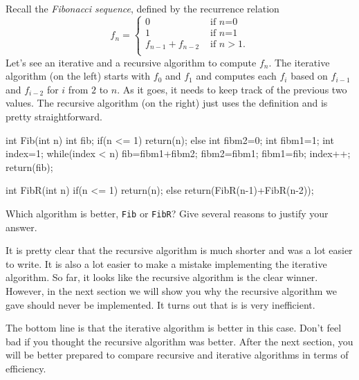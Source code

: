 \begin{exa}\label{exa:fibAlg}
Recall the {\em Fibonacci sequence}, defined by the recurrence relation
$$f_n=\left\{
\begin{array}{ll}
0&\mbox{ if $n$=0}\\
1&\mbox{ if $n$=1}\\
f_{n-1}+f_{n-2}&\mbox{ if }n>1.\\
\end{array}
\right.
$$
Let's see an iterative and a recursive algorithm to compute $f_n$.
The iterative algorithm (on the left) starts with $f_0$ and $f_1$ and computes
each $f_i$ based on $f_{i-1}$ and $f_{i-2}$ for $i$ from $2$ to $n$.
As it goes, it needs to keep track of the previous two values.
The recursive algorithm (on the right) just uses the definition and is pretty
straightforward.

\noindent
\begin{minipage}[t]{.4\textwidth}
\begin{code}
int Fib(int n) {
    int fib;
    if(n <= 1) {
       return(n);
    } else {
       int fibm2=0;
       int fibm1=1;
       int index=1;
       while(index < n) {
          fib=fibm1+fibm2;
          fibm2=fibm1;
          fibm1=fib;
          index++;
       }
       return(fib); 
    }
}
\end{code} 
\end{minipage}
\hfill 
\begin{minipage}[t]{.5\textwidth}
\begin{code}
int FibR(int n) {
    if(n <= 1) {
       return(n);
    } else { 
       return(FibR(n-1)+FibR(n-2));
    }
}
\end{code} 
\end{minipage}
\end{exa}

\begin{ques}\label{ques:fibrineff}
Which algorithm is better, \verb+Fib+ or \verb+FibR+? Give several reasons to justify your answer.

\noindent
\answerlinethree
\begin{answer}
It is pretty clear that the recursive algorithm
is much shorter and was a lot easier to write.  
It is also a lot easier to
make a mistake implementing the iterative algorithm.
So far, it looks like the recursive algorithm is the clear winner.
However, in the next section we will show you why the recursive 
algorithm we gave should never be implemented.  It turns out that is is
very inefficient.

The bottom line is that the iterative algorithm is better in this case.
Don't feel bad if you thought the recursive algorithm was better.
After the next section, you will be better prepared to compare
recursive and iterative algorithms in terms of efficiency.
\end{answer}
\end{ques}

